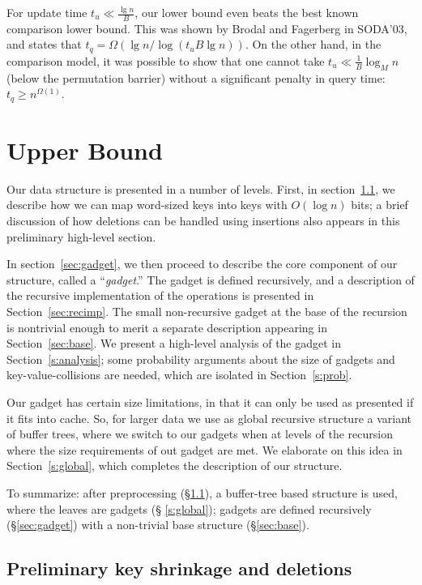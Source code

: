 \documentclass[letterpaper,11pt]{article}
\begin{document}
For update time $t_u \ll \frac{\lg n}{B}$, our lower bound even beats
the best known comparison lower bound. This was shown by Brodal and
Fagerberg \cite{brodal03buffer} in SODA'03, and states that $t_q =
\Omega(\lg n / \log(t_u B \lg n))$. On the other hand, in the
comparison model, it was possible to show \cite{brodal03buffer} that
one cannot take $t_u \ll \frac{1}{B} \log_M n$ (below the permutation
barrier) without a significant penalty in query time: $t_q \ge
n^{\Omega(1)}$.




\section{Upper Bound}

Our data structure is presented in a number of levels. First, in
section~\ref{sec:shrinkage}, we describe how we can map word-sized
keys into keys with $O(\log n)$ bits; a brief discussion of how
deletions can be handled using insertions also appears in this
preliminary high-level section.

In section~\ref{sec:gadget}, we then proceed to describe the core
component of our structure, called a ``\emph{gadget}.'' The gadget is
defined recursively, and a description of the recursive implementation
of the operations is presented in Section~\ref{sec:recimp}. The small
non-recursive gadget at the base of the recursion is nontrivial enough
to merit a separate description appearing in
Section~\ref{sec:base}. We present a high-level analysis of the gadget
in Section~\ref{s:analysis}; some probability arguments about the size
of gadgets and key-value-collisions are needed, which are isolated in
Section~\ref{s:prob}.

Our gadget has certain size limitations, in that it can only be used
as presented if it fits into cache. So, for larger data we use as
global recursive structure a variant of buffer trees, where we switch
to our gadgets when at levels of the recursion where the size
requirements of out gadget are met. We elaborate on this idea in
Section~\ref{s:global}, which completes the description of our
structure.

To summarize: after preprocessing (\S \ref{sec:shrinkage}), a
buffer-tree based structure is used, where the leaves are gadgets (\S
\ref{s:global}); gadgets are defined recursively (\S \ref{sec:gadget})
with a non-trivial base structure (\S \ref{sec:base}).

\subsection{Preliminary key shrinkage and deletions}\label{sec:shrinkage}
\end{document}
